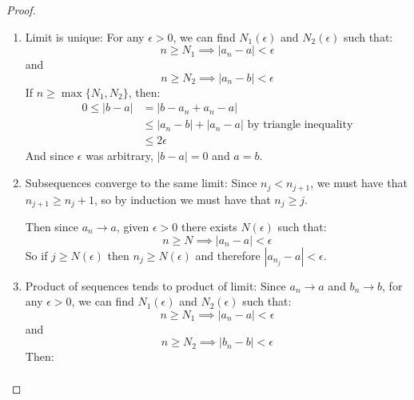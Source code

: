 \documentclass[../Main.tex]{subfiles}
\begin{document}
\begin{proof}
    \begin{enumerate}
        \item Limit is unique:
            For any $\epsilon > 0$, we can find $N_1(\epsilon)$ and $N_2(\epsilon)$ such that:
            \begin{equation*}
                n \geq N_1 \implies |a_n - a| < \epsilon
            \end{equation*}
            and
            \begin{equation*}
                n \geq N_2 \implies |a_n - b| < \epsilon
            \end{equation*}
            If $n \geq \max{\{N_1, N_2\}}$, then:
            \begin{align*}
                0 \leq |b - a| &= |b - a_n + a_n - a| \\
                &\leq |a_n - b| + |a_n - a| \text{ by triangle inequality} \\
                &\leq 2\epsilon
            \end{align*}
            And since $\epsilon$ was arbitrary, $|b - a| = 0$ and $a = b$. \proofend
        \item Subsequences converge to the same limit:
        Since $n_j < n_{j + 1}$, we must have that $n_{j + 1} \geq n_j + 1$, so by induction we must have that $n_j \geq j$.\par
        Then since $a_n \rightarrow a$, given $\epsilon > 0$ there exists $N(\epsilon)$ such that:
        \begin{equation*}
            n \geq N \implies |a_n - a| < \epsilon
        \end{equation*}
        So if $j \geq N(\epsilon)$ then $n_j \geq N(\epsilon)$ and therefore $|a_{n_j} - a| < \epsilon$. \proofend
        \setcounter{enumi}{4} %
        \item Product of sequences tends to product of limit:
        Since $a_n \rightarrow a$ and $b_n \rightarrow b$, for any $\epsilon > 0$, we can find $N_1(\epsilon)$ and $N_2(\epsilon)$ such that:
            \begin{equation*}
                n \geq N_1 \implies |a_n - a| < \epsilon
            \end{equation*}
            and
            \begin{equation*}
                n \geq N_2 \implies |b_n - b| < \epsilon
            \end{equation*}
            Then:
            \begin{align*}

\end{align*}
\end{enumerate}
\end{proof}
\end{document}
